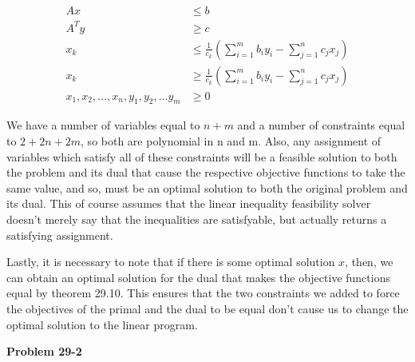 \documentclass{article}
\begin{document}
\begin{enumerate}[a.]
\begin{align*}
Ax&\le b\\
A^T y &\ge c\\
x_k &\le \frac{1}{c_k} \left(\sum_{i=1}^m b_i y_i - \sum_{j=1}^n c_j x_j\right)\\
x_k &\ge \frac{1}{c_k} \left(\sum_{i=1}^m b_i y_i - \sum_{j=1}^n c_j x_j\right)\\
x_1,x_2,\ldots,x_n,y_1,y_2,\ldots y_m &\ge 0
\end{align*}

We have a number of variables equal to $n+m$ and a number of constraints equal to $2 + 2n +2m$, so both are polynomial in n and m. Also, any assignment of variables which satisfy all of these constraints will be a feasible solution to both the problem and its dual that cause the respective objective functions to take the same value, and so, must be an optimal solution to both the original problem and its dual. This of course assumes that the linear inequality feasibility solver doesn't merely say that the inequalities are satisfyable, but actually returns a satisfying assignment.

Lastly, it is necessary to note that if there is some optimal solution $x$, then, we can obtain an optimal solution for the dual that makes the objective functions equal by theorem 29.10. This ensures that the two constraints we added to force the objectives of the primal and the dual to be equal don't cause us to change the optimal solution to the linear program.
\end{enumerate}

\noindent\textbf{Problem 29-2}\\
\end{document}
